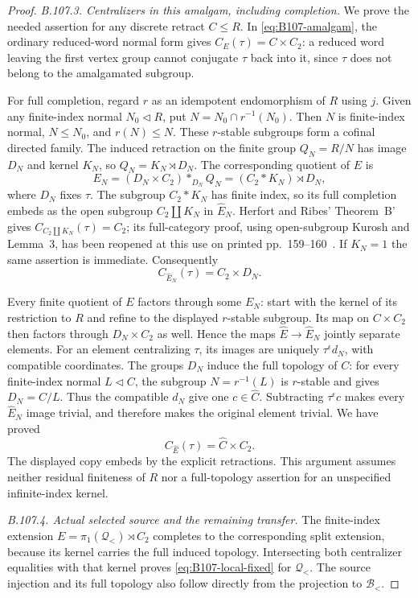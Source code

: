 \begin{proof}
\emph{B.107.3. Centralizers in this amalgam, including completion.}
We prove the needed assertion for any discrete retract $C\le R$.
In \eqref{eq:B107-amalgam}, the ordinary reduced-word normal form
gives $C_E(\tau)=C\times C_2$: a reduced word leaving the first
vertex group cannot conjugate $\tau$ back into it, since $\tau$
does not belong to the amalgamated subgroup.

For full completion, regard $r$ as an idempotent endomorphism of
$R$ using $j$. Given any finite-index normal $N_0\lhd R$, put
$N=N_0\cap r^{-1}(N_0)$. Then $N$ is finite-index normal,
$N\le N_0$, and $r(N)\le N$. These $r$-stable subgroups form
a cofinal directed family. The induced retraction on the finite
group $Q_N=R/N$ has image $D_N$ and kernel $K_N$, so
$Q_N=K_N\rtimes D_N$. The corresponding quotient of $E$ is
\begin{equation}\label{eq:B107-heads}
 E_N=(D_N\times C_2)*_{D_N}Q_N
       =(C_2*K_N)\rtimes D_N,
\end{equation}
where $D_N$ fixes $\tau$. The subgroup $C_2*K_N$ has finite
index, so its full completion embeds as the open subgroup
$C_2\amalg K_N$ in $\widehat E_N$.
Herfort and Ribes' Theorem~B' gives
$C_{C_2\amalg K_N}(\tau)=C_2$; its full-category proof, using
open-subgroup Kurosh and Lemma~3, has been reopened at this use
on printed pp.~159--160~\citep{A_HR1985}.
If $K_N=1$ the same assertion is immediate. Consequently
\[
 C_{\widehat E_N}(\tau)=C_2\times D_N.
\]

Every finite quotient of $E$ factors through some $E_N$: start
with the kernel of its restriction to $R$ and refine to the
displayed $r$-stable subgroup. Its map on $C\times C_2$ then
factors through $D_N\times C_2$ as well. Hence the maps
$\widehat E\to\widehat E_N$ jointly separate elements.
For an element centralizing $\tau$, its images are uniquely
$\tau^\epsilon d_N$, with compatible coordinates. The groups
$D_N$ induce the full topology of $C$: for every finite-index
normal $L\lhd C$, the subgroup $N=r^{-1}(L)$ is $r$-stable
and gives $D_N=C/L$. Thus the compatible $d_N$ give one
$c\in\widehat C$. Subtracting $\tau^\epsilon c$ makes every
$\widehat E_N$ image trivial, and therefore makes the original
element trivial. We have proved
\[
 C_{\widehat E}(\tau)=\widehat C\times C_2.
\]
The displayed copy embeds by the explicit retractions. This
argument assumes neither residual finiteness of $R$ nor a
full-topology assertion for an unspecified infinite-index kernel.

\emph{B.107.4. Actual selected source and the remaining transfer.}
The finite-index extension $E=\pi_1(\mathscr Q_<)\rtimes C_2$
completes to the corresponding split extension, because its
kernel carries the full induced topology. Intersecting both
centralizer equalities with that kernel proves
\eqref{eq:B107-local-fixed} for $\mathscr Q_<$.
The source injection and its full topology also follow directly
from the projection to $\mathscr B_<$.


\end{proof}
